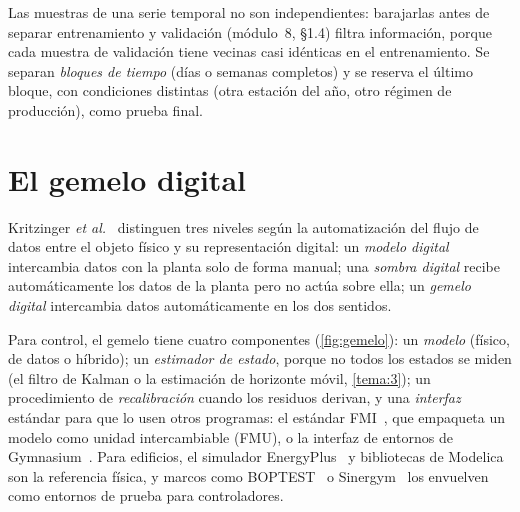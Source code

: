 \begin{observacion}\label{obs:particion}
Las muestras de una serie temporal no son independientes: barajarlas antes de separar entrenamiento y validación (módulo~8, §1.4) filtra información, porque cada muestra de validación tiene vecinas casi idénticas en el entrenamiento. Se separan \emph{bloques de tiempo} (días o semanas completos) y se reserva el último bloque, con condiciones distintas (otra estación del año, otro régimen de producción), como prueba final.
\end{observacion}

\section{El gemelo digital}

\begin{definicion}\label{def:gemelo}
Kritzinger \emph{et al.}~\cite{kritzinger} distinguen tres niveles según la automatización del flujo de datos entre el objeto físico y su representación digital: un \emph{modelo digital} intercambia datos con la planta solo de forma manual; una \emph{sombra digital} recibe automáticamente los datos de la planta pero no actúa sobre ella; un \emph{gemelo digital} intercambia datos automáticamente en los dos sentidos.
\end{definicion}

\addtocounter{figure}{1}%

Para control, el gemelo tiene cuatro componentes (\cref{fig:gemelo}): un \emph{modelo} (físico, de datos o híbrido); un \emph{estimador de estado}, porque no todos los estados se miden (el filtro de Kalman o la estimación de horizonte móvil, \cref{tema:3}); un procedimiento de \emph{recalibración} cuando los residuos derivan, y una \emph{interfaz} estándar para que lo usen otros programas: el estándar FMI~\cite{fmi}, que empaqueta un modelo como unidad intercambiable (FMU), o la interfaz de entornos de Gymnasium~\cite{gymnasium}. Para edificios, el simulador EnergyPlus~\cite{crawley} y bibliotecas de Modelica~\cite{modelica} son la referencia física, y marcos como BOPTEST~\cite{boptest} o Sinergym~\cite{sinergym} los envuelven como entornos de prueba para controladores.

\addtocounter{definicion}{1}%

